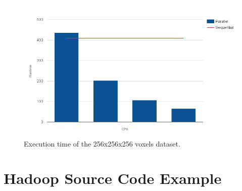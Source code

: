 \begin{figure}[h!]
	\centering
	\includegraphics[scale=0.4]{img/fdk-256.png}
	\caption[]{Execution time of the 256x256x256 voxels dataset. \label{fig:fdk-256}}
\end{figure}

\chapter{Hadoop Source Code Example}


